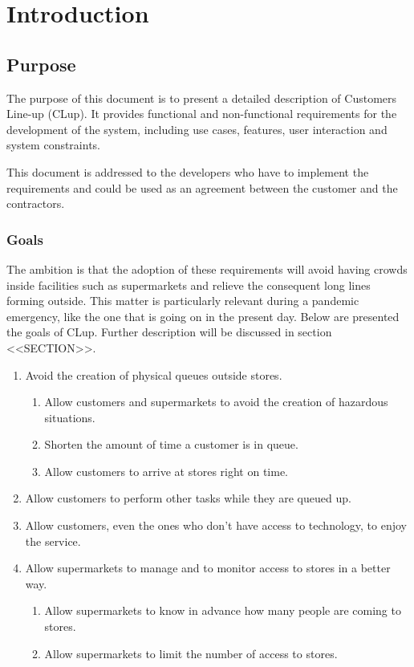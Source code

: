 \chapter{Introduction}

\section{Purpose}
The purpose of this document is to present a detailed description of Customers Line-up (CLup).
It provides functional and non-functional requirements for the development of the system, including use cases, features, user interaction and system constraints.

This document is addressed to the developers who have to implement the requirements and could be used as an agreement between the customer and the contractors.

\subsection{Goals}
The ambition is that the adoption of these requirements will avoid having crowds inside facilities such as supermarkets and relieve the consequent long lines forming outside. This matter is particularly relevant during a pandemic emergency, like the one that is going on in the present day.\newline
Below are presented the goals of CLup. Further description will be discussed in section <<SECTION>>.

\begin{enumerate}[label=\textbf{G.\arabic*}]
	\item Avoid the creation of physical queues outside stores.
	\begin{enumerate}[label*=\textbf{.\arabic*}]
		\item Allow customers and supermarkets to avoid the creation of hazardous situations.
		\item Shorten the amount of time a customer is in queue.
		\item Allow customers to arrive at stores right on time.
	\end{enumerate}

	\item Allow customers to perform other tasks while they are queued up.

	\item Allow customers, even the ones who don't have access to technology, to enjoy the service.

	\item Allow supermarkets to manage and to monitor access to stores in a better way.
	\begin{enumerate}[label*=\textbf{.\arabic*}]
		\item Allow supermarkets to know in advance how many people are coming to stores.
		\item Allow supermarkets to limit the number of access to stores.
	\end{enumerate}


\end{enumerate}

